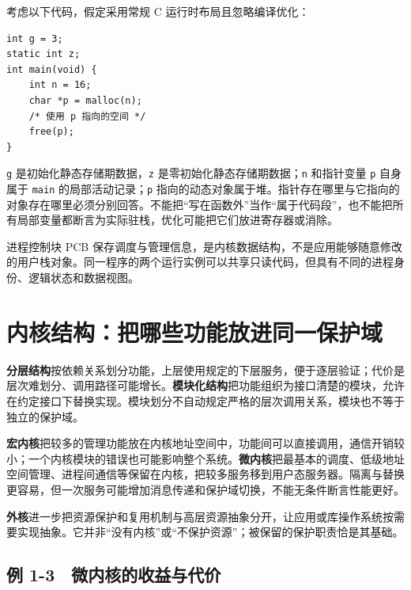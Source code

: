 考虑以下代码，假定采用常规 C 运行时布局且忽略编译优化：

\par\medskip\noindent
\begin{minipage}{\linewidth}
\begin{verbatim}
int g = 3;
static int z;
int main(void) {
    int n = 16;
    char *p = malloc(n);
    /* 使用 p 指向的空间 */
    free(p);
}
\end{verbatim}
\end{minipage}\par\medskip

\allowbreak{}\texttt{g} 是初始化静态存储期数据，\allowbreak{}\texttt{z} 是零初始化静态存储期数据；\allowbreak{}\texttt{n} 和指针变量 \allowbreak{}\texttt{p} 自身属于 \allowbreak{}\texttt{main} 的局部活动记录；\allowbreak{}\texttt{p} 指向的动态对象属于堆。指针存在哪里与它指向的对象存在哪里必须分别回答。不能把``写在函数外''当作``属于代码段''，也不能把所有局部变量都断言为实际驻栈，优化可能把它们放进寄存器或消除。

进程控制块 PCB 保存调度与管理信息，是内核数据结构，不是应用能够随意修改的用户栈对象。同一程序的两个运行实例可以共享只读代码，但具有不同的进程身份、逻辑状态和数据视图。

\section{内核结构：把哪些功能放进同一保护域}\label{os-1-8}

\textbf{分层结构}按依赖关系划分功能，上层使用规定的下层服务，便于逐层验证；代价是层次难划分、调用路径可能增长。\textbf{模块化结构}把功能组织为接口清楚的模块，允许在约定接口下替换实现。模块划分不自动规定严格的层次调用关系，模块也不等于独立的保护域。

\textbf{宏内核}把较多的管理功能放在内核地址空间中，功能间可以直接调用，通信开销较小；一个内核模块的错误也可能影响整个系统。\textbf{微内核}把最基本的调度、低级地址空间管理、进程间通信等保留在内核，把较多服务移到用户态服务器。隔离与替换更容易，但一次服务可能增加消息传递和保护域切换，不能无条件断言性能更好。

\textbf{外核}进一步把资源保护和复用机制与高层资源抽象分开，让应用或库操作系统按需要实现抽象。它并非``没有内核''或``不保护资源''；被保留的保护职责恰是其基础。

\subsection{例 1-3　微内核的收益与代价}\label{os-ex1-3}

